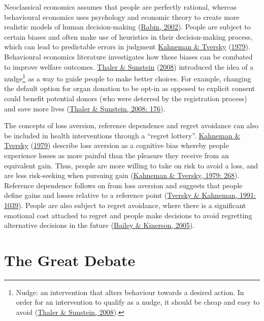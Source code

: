 \documentclass[11pt,preprint, authoryear]{elsarticle}
\numberwithin{equation}{section}
\numberwithin{figure}{section}
\numberwithin{table}{section}
\let\rmarkdownfootnote\footnote%
\def\footnote{\protect\rmarkdownfootnote}
\begin{document}
Neoclassical economics assumes that people are perfectly rational,
whereas behavioural economics uses psychology and economic theory to
create more realistic models of human decision-making
(\protect\hyperlink{ref-rabin}{Rabin, 2002}). People are subject to
certain biases and often make use of heuristics in their decision-making
process, which can lead to predictable errors in judgment
\protect\hyperlink{ref-prospect}{Kahneman \& Tversky}
(\protect\hyperlink{ref-prospect}{1979}). Behavioural economics
literature investigates how these biases can be combated to improve
welfare outcomes. \protect\hyperlink{ref-nudge}{Thaler \& Sunstein}
(\protect\hyperlink{ref-nudge}{2008}) introduced the idea of a
nudge\footnote{Nudge: an intervention that alters behaviour towards a
  desired action. In order for an intervention to qualify as a nudge, it
  should be cheap and easy to avoid
  (\protect\hyperlink{ref-nudge}{Thaler \& Sunstein, 2008}).} as a way
to guide people to make better choices. For example, changing the
default option for organ donation to be opt-in as opposed to explicit
consent could benefit potential donors (who were deterred by the
registration process) and save more lives
(\protect\hyperlink{ref-nudge}{Thaler \& Sunstein, 2008: 176}).

The concepts of loss aversion, reference dependence and regret avoidance
can also be included in health interventions through a ``regret
lottery''. \protect\hyperlink{ref-prospect}{Kahneman \& Tversky}
(\protect\hyperlink{ref-prospect}{1979}) describe loss aversion as a
cognitive bias whereby people experience losses as more painful than the
pleasure they receive from an equivalent gain. Thus, people are more
willing to take on risk to avoid a loss, and are less risk-seeking when
pursuing gain (\protect\hyperlink{ref-prospect}{Kahneman \& Tversky,
1979: 268}). Reference dependence follows on from loss aversion and
suggests that people define gains and losses relative to a reference
point (\protect\hyperlink{ref-ref}{Tversky \& Kahneman, 1991: 1039}).
People are also subject to regret avoidance, where there is a
significant emotional cost attached to regret and people make decisions
to avoid regretting alternative decisions in the future
(\protect\hyperlink{ref-regret}{Bailey \& Kinerson, 2005}).

\hypertarget{the-great-debate}{%
\section{\texorpdfstring{The Great Debate
\label{rev}}{The Great Debate }}\label{the-great-debate}}
\end{document}
